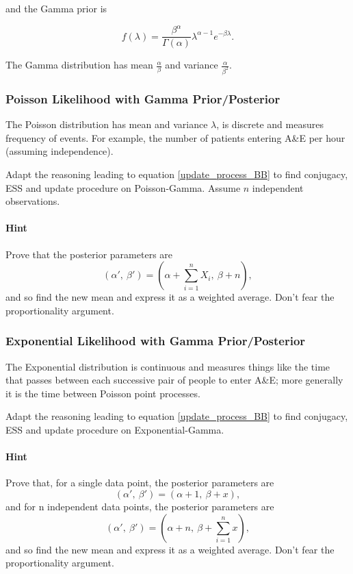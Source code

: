 \documentclass{article}
\begin{document}
and the Gamma prior is

\begin{equation}
    f(\lambda)=\frac{\beta^\alpha}{\Gamma(\alpha)}{\lambda^{\alpha-1}e^{-\beta\lambda}}.
\end{equation}

The Gamma distribution has mean $\frac{\alpha}{\beta}$ and variance $\frac{\alpha}{\beta^2}$.

\subsubsection{Poisson Likelihood with Gamma Prior/Posterior}
The Poisson distribution has mean and variance $\lambda$, is discrete and measures frequency of events. For example, the number of patients entering A\&E per hour (assuming independence).

\begin{Exercise}
    Adapt the reasoning leading to equation \eqref{update_process_BB} to find conjugacy, ESS and update procedure on Poisson-Gamma. Assume $n$ independent observations.
    
    \paragraph{Hint}
    Prove that the posterior parameters are
    \begin{equation}
        (\alpha', \ \beta')=(\alpha+\sum_{i=1}^n X_i, \ \beta+n),
    \end{equation}
    and so find the new mean and express it as a weighted average. Don't fear the proportionality argument.
\end{Exercise}

\subsubsection{Exponential Likelihood with Gamma Prior/Posterior}
The Exponential distribution is continuous and measures things like the time that passes between each successive pair of people to enter A\&E; more generally it is the time between Poisson point processes.

\begin{Exercise}
    Adapt the reasoning leading to equation \eqref{update_process_BB} to find conjugacy, ESS and update procedure on Exponential-Gamma.
    
    \paragraph{Hint}
    Prove that, for a single data point, the posterior parameters are
    \begin{equation}
        (\alpha', \ \beta')=(\alpha+1, \ \beta+x),
    \end{equation}
    and for n independent data points, the posterior parameters are
    \begin{equation}
        (\alpha', \ \beta')=(\alpha+n, \ \beta+\sum_{i=1}^n x),
    \end{equation}
    and so find the new mean and express it as a weighted average. Don't fear the proportionality argument.
\end{Exercise}
\end{document}
